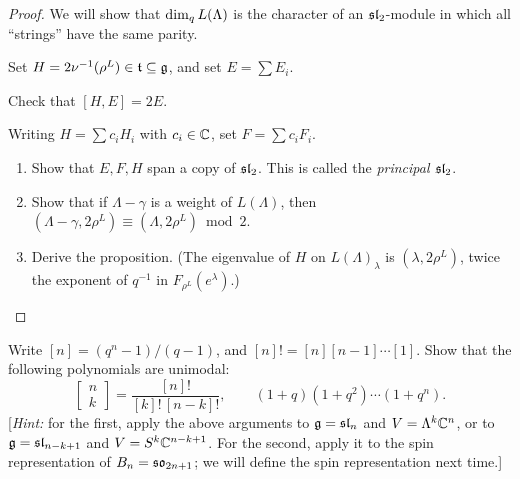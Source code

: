 \begin{proof}
We will show that $\dimq L(\Lambda)$ is the character of an $\sl_2$-module in
which all ``strings'' have the same parity.

Set $H = 2\nu^{-1}(\rho^L) \in \at \subseteq \g$, and set $E = \sum E_i$.

\begin{exercise}
Check that $[H, E] = 2E$.
\end{exercise}

Writing $H = \sum c_iH_i$ with $c_i \in \C$, set $F = \sum c_iF_i$.

\begin{exercise}\leavevmode
\begin{enumerate}
  \item Show that $E, F, H$ span a copy of $\sl_2$. This is called the
    \emph{principal $\sl_2$}.
  \item Show that if $\Lambda - \gamma$ is a weight of $L(\Lambda)$, then
    $(\Lambda - \gamma, 2\rho^L) \equiv (\Lambda, 2\rho^L) \bmod 2$.
  \item Derive the proposition. (The eigenvalue of $H$ on $L(\Lambda)_\lambda$
    is $(\lambda, 2\rho^L)$, twice the exponent of $q^{-1}$ in
    $F_{\rho^L}(e^\lambda)$.) \qedhere
\end{enumerate}
\end{exercise}
\end{proof}

\begin{exercise}
Write $[n] = (q^n - 1)/(q - 1)$, and $[n]! = [n][n-1]\cdots[1]$. Show that the
following polynomials are unimodal:
\[
  \begin{bmatrix} n \\ k \end{bmatrix} = \frac{[n]!}{[k]!\,[n-k]!}, \qquad
  (1 + q)(1 + q^2)\cdots(1 + q^n).
\]
[\emph{Hint:} for the first, apply the above arguments to $\g = \sl_n$ and
$V = \Lambda^k\C^n$, or to $\g = \sl_{n-k+1}$ and $V = S^k\C^{n-k+1}$. For
the second, apply it to the spin representation of $B_n = \so_{2n+1}$; we will
define the spin representation next time.]
\end{exercise}

